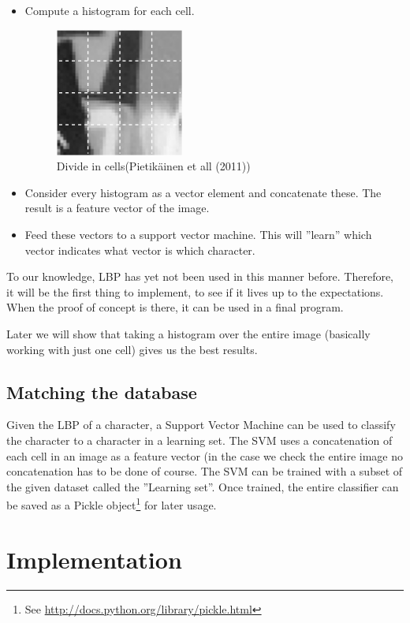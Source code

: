 \documentclass[a4paper]{article}
\begin{document}
\begin{itemize}
\item Compute a histogram for each cell.

\begin{figure}[H]
\center
\includegraphics[scale=0.7]{cells.png}
\caption{Divide in cells(Pietik\"ainen et all (2011))}
\end{figure}

\item Consider every histogram as a vector element and concatenate these. The
result is a feature vector of the image.

\item Feed these vectors to a support vector machine. This will ''learn'' which
vector indicates what vector is which character. 

\end{itemize}

To our knowledge, LBP has yet not been used in this manner before. Therefore,
it will be the first thing to implement, to see if it lives up to the
expectations. When the proof of concept is there, it can be used in a final
program.

Later we will show that taking a histogram over the entire image (basically
working with just one cell) gives us the best results.

\subsection{Matching the database}

Given the LBP of a character, a Support Vector Machine can be used to classify
the character to a character in a learning set. The SVM uses a concatenation
of each cell in an image as a feature vector (in the case we check the entire
image no concatenation has to be done of course. The SVM can be trained with a
subset of the given dataset called the ''Learning set''. Once trained, the
entire classifier can be saved as a Pickle object\footnote{See
\url{http://docs.python.org/library/pickle.html}} for later usage.

\section{Implementation}
\end{document}
